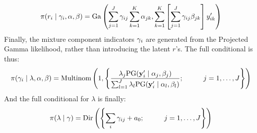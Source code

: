 \begin{equation}
\pi(r_i\mid{\bf \gamma}_i, {\bf \alpha}, {\bf \beta}) = \text{Ga}\left(\sum_{j = 1}^J\gamma_{ij}\sum_{k = 1}^K\alpha_{jk}, \sum_{k = 1}^K\left[\sum_{j = 1}^J\gamma_{ij}\beta_{jk}\right]y_{ik}^{\prime}\right)
\end{equation}
Finally, the mixture component indicators ${\bf \gamma}_i$ are generated from
  the Projected Gamma likelihood, rather than introducing the latent $r$'s.
  The full conditional is thus:
\begin{equation}
\pi({\bf \gamma}_i\mid {\bf \lambda},{\bf \alpha},{\bf \beta}) = \text{Multinom}\left(1, \left\lbrace\frac{\lambda_j\text{PG}({\bf y}_i^{\prime}\mid{\bf \alpha}_j,{\bf \beta}_j)}{\sum_{l = 1}^J\lambda_l\text{PG}({\bf y}_i^{\prime}\mid{\bf \alpha}_l,{\bf \beta}_l)}; \hspace{1cm}j = 1,\ldots,J\right\rbrace\right)
\end{equation}
And the full conditional for $\lambda$ is finally:
\begin{equation}
\pi({\bf \lambda}\mid{\bf \gamma}) = \text{Dir}\left(
\left\lbrace \sum_i\gamma_{ij} + a_0; \hspace{1cm}j = 1,\ldots,J\right\rbrace\right)
\end{equation}

